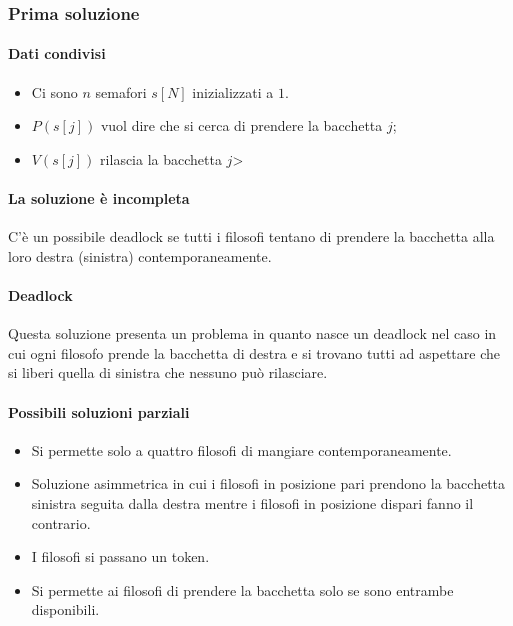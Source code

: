 \subsubsection{Prima soluzione}
\begin{multicols}{2}
	\paragraph{Dati condivisi}
	\begin{itemize}
		\item Ci sono $n$ semafori $s[N]$ inizializzati a $1$.
		\item $P(s[j])$ vuol dire che si cerca di prendere la bacchetta $j$;
		\item $V(s[j])$ rilascia la bacchetta $j$>
	\end{itemize}
	\paragraph{La soluzione \`e incompleta} C'\`e un possibile deadlock se tutti i filosofi tentano di prendere la bacchetta alla loro destra (sinistra) contemporaneamente. 
	\columnbreak
	
\end{multicols}
\paragraph{Deadlock}
Questa soluzione presenta un problema in quanto nasce un deadlock nel caso in cui ogni filosofo prende la bacchetta di destra e si trovano tutti ad aspettare che si liberi quella di 
sinistra che nessuno pu\`o rilasciare. 
\paragraph{Possibili soluzioni parziali}
\begin{itemize}
	\item Si permette solo a quattro filosofi di mangiare contemporaneamente.
	\item Soluzione asimmetrica in cui i filosofi in posizione pari prendono la bacchetta sinistra seguita dalla destra mentre i filosofi in posizione dispari fanno il contrario.
	\item I filosofi si passano un token.
	\item Si permette ai filosofi di prendere la bacchetta solo se sono entrambe disponibili.
\end{itemize}
